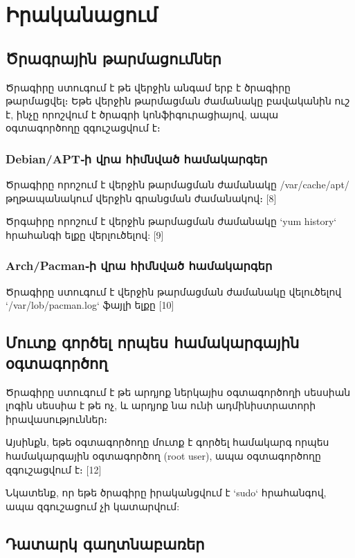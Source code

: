 \documentclass[11pt]{article}
\begin{document}
\begin{sloppypar}
\section{Իրականացում}


\subsection{Ծրագրային թարմացումներ}

Ծրագիրը ստուգում է թե վերջին անգամ երբ է ծրագիրը թարմացվել։
Եթե վերջին թարմացման ժամանակը բավականին ուշ է, ինչը
որոշվում է ծրագրի կոնֆիգուրացիայով, ապա օգտագործողը
զգուշացվում է։


\subsubsection{Debian/APT֊ի վրա հիմնված համակարգեր}

Ծրագիրը որոշում է վերջին թարմացման ժամանակը /var/cache/apt/
թղթապանակում վերջին գրանցման ժամանակով։ [8]


Ծրգաիրը որոշում է վերջին թարմացման ժամանակը `yum history`
հրահանգի ելքը վերլուծելով: [9]

\subsubsection{Arch/Pacman֊ի վրա հիմնված համակարգեր}

Ծրագիրը ստուգում է վերջին թարմացման ժամանակը վելուծելով
`/var/lob/pacman.log` ֆայլի ելքը [10]

\subsection{Մուտք գործել որպես համակարգային օգտագործող}

Ծրագիրը ստուգում է թե արդյոք ներկայիս օգտագործողի սեսսիան
լոգին սեսսիա է թե ոչ, և արդյոք նա ունի ադմինիստրատորի
իրավասություններ։

Այսինքն, եթե օգտագործողը մուտք է գործել համակարգ որպես
համակարգային օգտագործող (root user), ապա օգտագործողը
զգուշացվում է։ [12]

Նկատենք, որ եթե ծրագիրը իրականցվում է `sudo` հրահանգով,
ապա զգուշացում չի կատարվում:


\subsection{Դատարկ գաղտնաբառեր}


\end{sloppypar}
\end{document}
